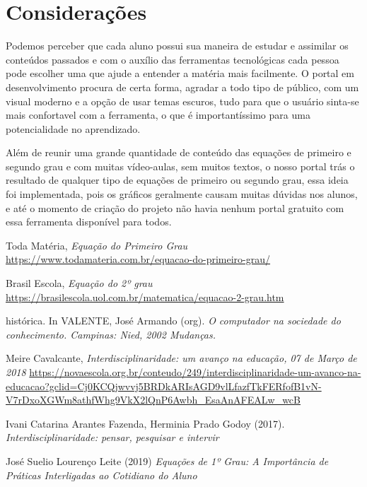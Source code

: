 \documentclass[12pt]{report}
\begin{document}
\chapter{Considerações}
Podemos perceber que cada aluno possui sua maneira de estudar e assimilar os conteúdos passados e com o auxílio das ferramentas tecnológicas cada pessoa pode escolher uma que ajude a entender a matéria mais facilmente. O portal em desenvolvimento procura de certa forma, agradar a todo tipo de público, com um visual moderno e a opção de usar temas escuros, tudo para que o usuário sinta-se mais confortavel com a ferramenta, o que é importantíssimo para uma potencialidade no aprendizado.

Além de reunir uma grande quantidade de conteúdo das equações de primeiro e segundo grau e com muitas vídeo-aulas, sem muitos textos, o nosso portal trás o resultado de qualquer tipo de equações de primeiro ou segundo grau, essa ideia foi implementada, pois os gráficos geralmente causam muitas dúvidas nos alunos, e até o momento de criação do projeto não havia nenhum portal gratuito com essa ferramenta disponível para todos.

\begin{thebibliography}{9}

\noindent Toda Matéria, 
\textit{Equação do Primeiro Grau}
\url{https://www.todamateria.com.br/equacao-do-primeiro-grau/}

\noindent Brasil Escola, 
\textit{Equação do 2º grau}
\url{https://brasilescola.uol.com.br/matematica/equacao-2-grau.htm}

\noindent histórica. In VALENTE, José Armando (org). 
\textit{O computador na sociedade do conhecimento. Campinas: Nied, 2002 Mudanças.}

\noindent Meire Cavalcante,
\textit{Interdisciplinaridade: um avanço na educação, 07 de Março de 2018}
\url{https://novaescola.org.br/conteudo/249/interdisciplinaridade-um-avanco-na-educacao?gclid=Cj0KCQjwvvj5BRDkARIsAGD9vlLfazfTkFERfofB1vN-V7rDxoXGWm8athfWhg9VkX2lQnP6Awbh_EsaAnAFEALw_wcB}

\noindent Ivani Catarina Arantes Fazenda, Herminia Prado Godoy (2017).
\textit{Interdisciplinaridade: pensar, pesquisar e intervir}

\noindent José Suelio Lourenço Leite (2019)
\textit{Equações de 1º Grau: A Importância de Práticas Interligadas ao Cotidiano do Aluno}

\end{thebibliography}
\end{document}
